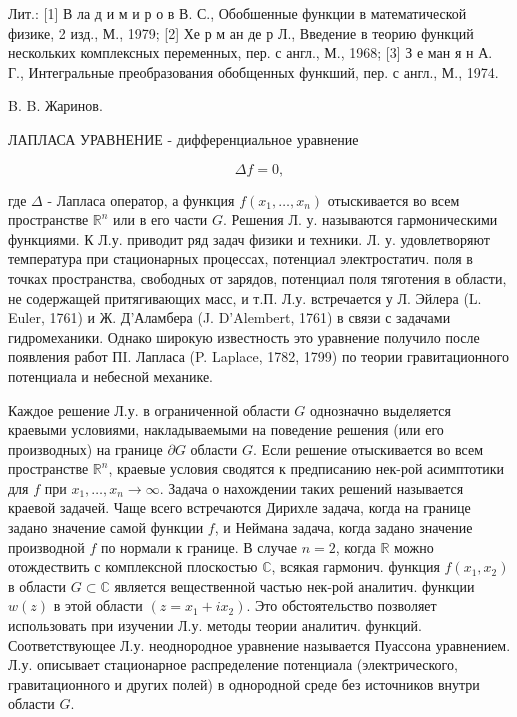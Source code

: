 \documentclass[10pt]{article}
\begin{document}
Лит.: [1] В ла д и м и р о в В. С., Обобшенные функции в математической физике, 2 изд., М., 1979; [2] Хе р м ан де р Л., Введение в теорию функций нескольких комплексных переменных, пер. с англ., М., 1968; [3] З е ман я н А. Г., Интегральные преобразования обобщенных функший, пер. с англ., М., 1974.



B. B. Жаринов.



ЛАПЛАСА УРАВНЕНИЕ - дифференциальное уравнение



\[

\Delta f=0,

\]



где $\Delta$ - Лапласа оператор, а функция $f\left(x_{1}, \ldots, x_{n}\right)$ отыскивается во всем пространстве $\mathbb{R}^{n}$ или в его части $G$. Решения Л. у. называются гармоническими функциями. К Л.у. приводит ряд задач физики и техники. Л. у. удовлетворяют температура при стационарных процессах, потенциал электростатич. поля в точках пространства, свободных от зарядов, потенциал поля тяготения в области, не содержащей притягивающих масс, и т.П. Л.у. встречается у Л. Эйлера (L. Euler, 1761) и Ж. Д’Аламбера (J. D’Alembert, 1761) в связи с задачами гидромеханики. Однако широкую известность это уравнение получило после появления работ ПI. Лапласа (P. Laplace, 1782, 1799) по теории гравитационного потенциала и небесной механике.



Каждое решение Л.у. в ограниченной области $G$ однозначно выделяется краевыми условиями, накладываемыми на поведение решения (или его производных) на границе $\partial G$ области $G$. Если решение отыскивается во всем пространстве $\mathbb{R}^{n}$, краевые условия сводятся к предписанию нек-рой асимптотики для $f$ при $x_{1}, \ldots, x_{n} \rightarrow \infty$. Задача о нахождении таких решений называется краевой задачей. Чаще всего встречаются Дирихле задача, когда на границе задано значение самой функции $f$, и Неймана задача, когда задано значение производной $f$ по нормали к границе. В случае $n=2$, когда $\mathbb{R}$ можно отождествить с комплексной плоскостью $\mathbb{C}$, всякая гармонич. функция $f\left(x_{1}, x_{2}\right)$ в области $G \subset \mathbb{C}$ является вещественной частью нек-рой аналитич. функции $w(z)$ в этой области $\left(z=x_{1}+i x_{2}\right)$. Это обстоятельство позволяет использовать при изучении Л.у. методы теории аналитич. функций. Соответствующее Л.у. неоднородное уравнение называется Пуассона уравнением. Л.у. описывает стационарное распределение потенциала (электрического, гравитационного и других полей) в однородной среде без источников внутри области $G$.
\end{document}
